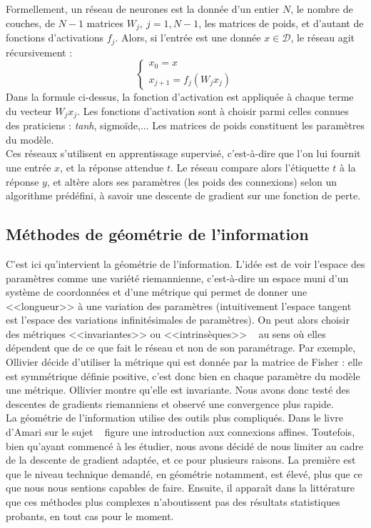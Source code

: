\documentclass{article}
\begin{document}
Formellement, un réseau de neurones est la donnée d'un entier $N$, le nombre de couches, de $N-1$ matrices $W_j, \ j=1,N-1$, les matrices de poids, et d'autant de fonctions d'activations $f_j$.  Alors, si l'entrée est une donnée $x\in \mathcal D$, le réseau agit récursivement :
\[\left\{\begin{array}{c}x_0=x\\ x_{j+1}=f_j(W_j x_j)\end{array}\right.\]
Dans la formule ci-dessus, la fonction d'activation est appliquée à chaque terme du vecteur $W_j x_j$. Les fonctions d'activation sont à choisir parmi celles connues des praticiens : \textit{tanh}, sigmoïde,... Les matrices de poids constituent les paramètres du modèle.\\

Ces réseaux s'utilisent en apprentissage supervisé, c'est-à-dire que l'on lui fournit une entrée $x$, et la réponse attendue $t$. Le réseau compare alors l'étiquette $t$ à la réponse $y$, et altère alors ses paramètres (les poids des connexions) selon un algorithme prédéfini, à savoir une descente de gradient sur une fonction de perte.\\

\subsection{Méthodes de géométrie de l'information}
C'est ici qu'intervient la géométrie de l'information. L'idée est de voir l'espace des paramètres comme une variété riemannienne, c'est-à-dire un espace muni d'un système de coordonnées et d'une métrique qui permet de donner une <<longueur>> à une variation des paramètres (intuitivement l'espace tangent est l'espace des variations infinitésimales de paramètres). On peut alors choisir des métriques <<invariantes>> ou <<intrinsèques>> ~\cite{Ollivier} au sens où elles dépendent que de ce que fait le réseau et non de son paramétrage. Par exemple, Ollivier décide d'utiliser la métrique qui est donnée par la matrice de Fisher : elle est symmétrique définie positive, c'est donc bien en chaque paramètre du modèle une métrique. Ollivier montre qu'elle est invariante. Nous avons donc testé des descentes de gradients riemanniens et observé une convergence plus rapide.\\

La géométrie de l'information utilise des outils plus compliqués. Dans le livre d'Amari sur le sujet ~\cite{Amari} figure une introduction aux connexions affines. Toutefois, bien qu'ayant commencé à les étudier, nous avons décidé de nous limiter au cadre de la descente de gradient adaptée, et ce pour plusieurs raisons. La première est que le niveau technique demandé, en géométrie notamment, est élevé, plus que ce que nous nous sentions capables de faire. Ensuite, il apparaît dans la littérature que ces méthodes plus complexes n'aboutissent pas des résultats statistiques probants, en tout cas pour le moment. \\
\end{document}

